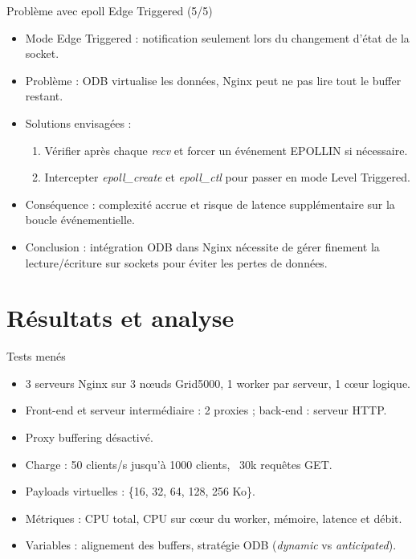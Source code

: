 \documentclass[aspectratio=43,8pt]{beamer}
\begin{document}
\begin{frame}{Problème avec epoll Edge Triggered (5/5)}
\begin{itemize}
    \item Mode Edge Triggered : notification seulement lors du changement d’état de la socket.
    \item Problème : ODB virtualise les données, Nginx peut ne pas lire tout le buffer restant.
    \item Solutions envisagées :
    \begin{enumerate}
        \item Vérifier après chaque \textit{recv} et forcer un événement EPOLLIN si nécessaire.
        \item Intercepter \textit{epoll\_create} et \textit{epoll\_ctl} pour passer en mode Level Triggered.
    \end{enumerate}
    \item Conséquence : complexité accrue et risque de latence supplémentaire sur la boucle événementielle.
    \item Conclusion : intégration ODB dans Nginx nécessite de gérer finement la lecture/écriture sur sockets pour éviter les pertes de données.
\end{itemize}
\end{frame}


\section{Résultats et analyse}

\begin{frame}{Tests menés}
\begin{itemize}
    \item 3 serveurs Nginx sur 3 nœuds Grid5000, 1 worker par serveur, 1 cœur logique.
    \item Front-end et serveur intermédiaire : 2 proxies ; back-end : serveur HTTP.
    \item Proxy buffering désactivé.
    \item Charge : 50 clients/s jusqu'à 1000 clients, ~30k requêtes GET.
    \item Payloads virtuelles : \{16, 32, 64, 128, 256 Ko\}.
    \item Métriques : CPU total, CPU sur cœur du worker, mémoire, latence et débit.
    \item Variables : alignement des buffers, stratégie ODB (\textit{dynamic} vs \textit{anticipated}).
\end{itemize}
\end{frame}
\end{document}
